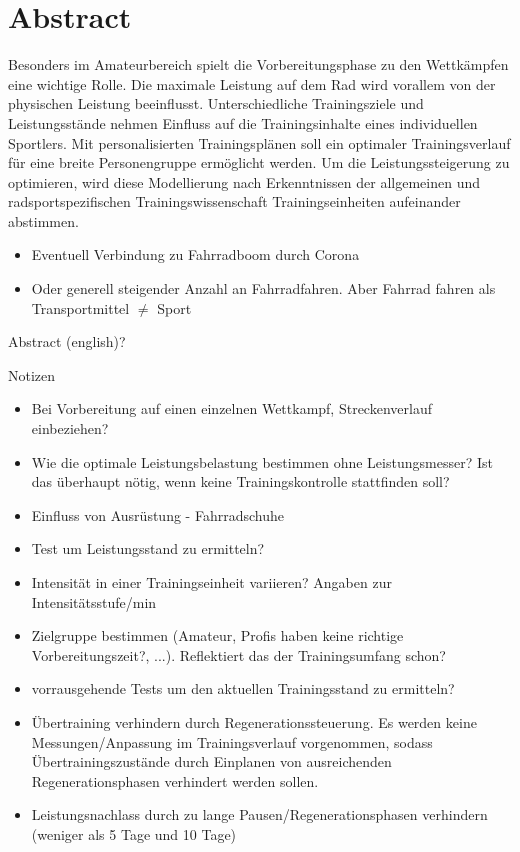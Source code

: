 \chapter*{Abstract}
\label{sec:abstract}
\vspace*{-10mm}
Besonders im Amateurbereich spielt die Vorbereitungsphase zu den Wettkämpfen eine wichtige Rolle. Die maximale Leistung auf dem Rad wird vorallem von der physischen Leistung beeinflusst. Unterschiedliche Trainingsziele und Leistungsstände nehmen Einfluss auf die Trainingsinhalte eines individuellen Sportlers. Mit personalisierten Trainingsplänen soll ein optimaler Trainingsverlauf für eine breite Personengruppe ermöglicht werden.
Um die Leistungssteigerung zu optimieren, wird diese Modellierung nach Erkenntnissen der allgemeinen und radsportspezifischen Trainingswissenschaft Trainingseinheiten aufeinander abstimmen.


\begin{itemize}
    \item Eventuell Verbindung zu Fahrradboom durch Corona
    \item Oder generell steigender Anzahl an Fahrradfahren. Aber Fahrrad fahren als Transportmittel $\neq$ Sport
\end{itemize}
\vspace*{20mm}

{Abstract (english)?}\label{sec:abstract-diff} \\
\vspace*{-10mm}
\clearpage

{Notizen}
\begin{itemize}
    \item Bei Vorbereitung auf einen einzelnen Wettkampf, Streckenverlauf einbeziehen?
    \item Wie die optimale Leistungsbelastung bestimmen ohne Leistungsmesser? Ist das überhaupt nötig, wenn keine Trainingskontrolle stattfinden soll?
    \item Einfluss von Ausrüstung - Fahrradschuhe
    \item Test um Leistungsstand zu ermitteln?
    \item Intensität in einer Trainingseinheit variieren? Angaben zur Intensitätsstufe/min
    \item Zielgruppe bestimmen (Amateur, Profis haben keine richtige Vorbereitungszeit?, ...). Reflektiert das der Trainingsumfang schon?
    \item vorrausgehende Tests um den aktuellen Trainingsstand zu ermitteln?
    \item Übertraining verhindern durch Regenerationssteuerung. Es werden keine Messungen/Anpassung im Trainingsverlauf vorgenommen, sodass Übertrainingszustände durch Einplanen von ausreichenden Regenerationsphasen verhindert werden sollen.
    \item Leistungsnachlass durch zu lange Pausen/Regenerationsphasen verhindern (weniger als 5 Tage und 10 Tage)
\end{itemize}